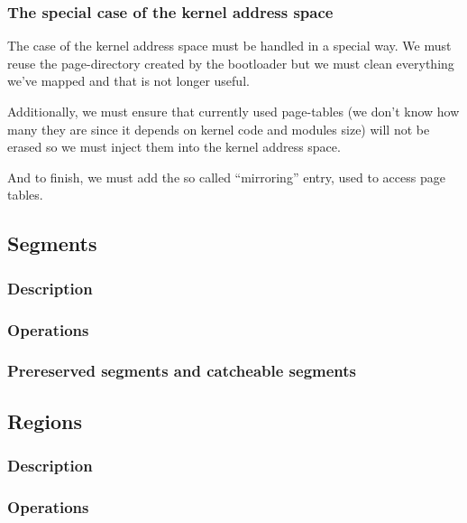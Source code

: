 
\begin{frame}
  \frametitle{The special case of the kernel address space}

  The case of the kernel address space must be handled in a special way. We must reuse the page-directory created by the bootloader but we must clean everything we've mapped and that is not longer useful.

  Additionally, we must ensure that currently used page-tables (we don't know how many they are since it depends on kernel code and modules size) will not be erased so we must inject them into the kernel address space.

  And to finish, we must add the so called ``mirroring'' entry, used to access page tables.

\end{frame}

%
%

\subsection{Segments}


\begin{frame}
  \frametitle{Description}
\end{frame}


\begin{frame}
  \frametitle{Operations}
\end{frame}


\begin{frame}
  \frametitle{Prereserved segments and catcheable segments}
\end{frame}

%
%

\subsection{Regions}


\begin{frame}
  \frametitle{Description}
\end{frame}


\begin{frame}
  \frametitle{Operations}
\end{frame}

